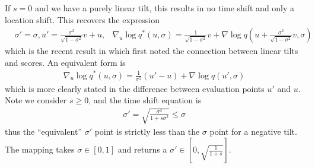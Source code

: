 \documentclass[11pt]{article}
\theoremstyle{proposition}
\theoremstyle{lemma}
\theoremstyle{corollary}
\theoremstyle{theorem}
\theoremstyle{definition}
\begin{document}
If $s = 0$ and we have a purely linear tilt, this results in no time shift and only a location shift. This recovers the expression
\begin{align}
&\sigma' = \sigma, u' = \frac{\sigma^{2}}{\sqrt{1-\sigma^{2}}}v+u,&\nabla_{u}\log q^{*}(u, \sigma)=\frac{1}{\sqrt{1-\sigma^{2}}}v+\nabla \log q(u+\frac{\sigma^{2}}{\sqrt{1-\sigma^{2}}}v, \sigma)
\end{align}
which is the recent result in \cite[Lemma 3.3]{moitra2026steering} which first noted the connection between linear tilts and scores.
An equivalent form is
\begin{align}
    \nabla_{u}\log q^{*}(u, \sigma)=\frac{1}{\sigma^{2}}(u'-u)+\nabla \log q(u', \sigma)
\end{align}
which is more clearly stated in the difference between evaluation points $u'$ and $u$. Note we consider $s\geq 0$, and the time shift equation is
\begin{align}
    \sigma' = \sqrt{\frac{\sigma^{2}}{1+s\sigma^{2}}}\leq  \sigma
\end{align}
thus the ``equivalent'' $\sigma'$ point is strictly less than the $\sigma$ point for a negative tilt. The mapping takes $\sigma \in [0,1]$ and returns a $\sigma' \in [0, \sqrt{\frac{1}{1+s}}]$.




\appendix
\end{document}
